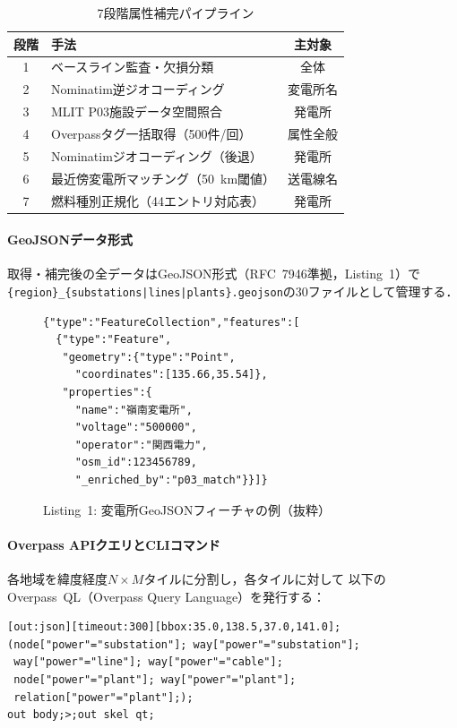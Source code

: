 \documentclass[fleqn]{ieej}
\begin{document}
\begin{table}[t]
  \caption{7段階属性補完パイプライン}
  \label{tab:enrich}
  \centering\small
  \begin{tabular}{clc}
    \toprule
    段階 & 手法 & 主対象 \\
    \midrule
    1 & ベースライン監査・欠損分類 & 全体 \\
    2 & Nominatim逆ジオコーディング & 変電所名 \\
    3 & MLIT P03施設データ空間照合 & 発電所 \\
    4 & Overpassタグ一括取得（500件/回） & 属性全般 \\
    5 & Nominatimジオコーディング（後退） & 発電所 \\
    6 & 最近傍変電所マッチング（50~km閾値） & 送電線名 \\
    7 & 燃料種別正規化（44エントリ対応表） & 発電所 \\
    \bottomrule
  \end{tabular}
\end{table}

\paragraph{GeoJSONデータ形式}
取得・補完後の全データはGeoJSON形式（RFC~7946準拠，Listing~1）で
\texttt{\{region\}\_\{substations|lines|plants\}.geojson}の30ファイルとして管理する．

\begin{figure}[h]
\begin{lstlisting}[language={}]
{"type":"FeatureCollection","features":[
  {"type":"Feature",
   "geometry":{"type":"Point",
     "coordinates":[135.66,35.54]},
   "properties":{
     "name":"嶺南変電所",
     "voltage":"500000",
     "operator":"関西電力",
     "osm_id":123456789,
     "_enriched_by":"p03_match"}}]}
\end{lstlisting}
\vspace{-6pt}
{\scriptsize Listing~1: 変電所GeoJSONフィーチャの例（抜粋）}
\end{figure}

\paragraph{Overpass APIクエリとCLIコマンド}
各地域を緯度経度$N\times M$タイルに分割し，各タイルに対して
以下のOverpass~QL（Overpass Query Language）を発行する：

\begin{lstlisting}[language={}]
[out:json][timeout:300][bbox:35.0,138.5,37.0,141.0];
(node["power"="substation"]; way["power"="substation"];
 way["power"="line"]; way["power"="cable"];
 node["power"="plant"]; way["power"="plant"];
 relation["power"="plant"];);
out body;>;out skel qt;
\end{lstlisting}
\end{document}

